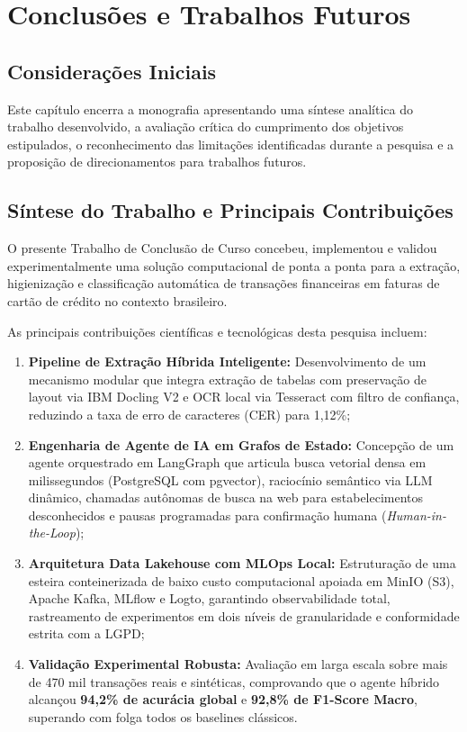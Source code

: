 \documentclass[
	12pt,				
	openright,			
	oneside,			
	a4paper,			
	english,			
	brazil				
	]{abntex2}
\begin{document}
\chapter{Conclusões e Trabalhos Futuros}
\label{chp:conclusao}

\section{Considerações Iniciais}
\label{sec:concl_consideracoes_iniciais}

Este capítulo encerra a monografia apresentando uma síntese analítica do trabalho desenvolvido, a avaliação crítica do cumprimento dos objetivos estipulados, o reconhecimento das limitações identificadas durante a pesquisa e a proposição de direcionamentos para trabalhos futuros.

\section{Síntese do Trabalho e Principais Contribuições}
\label{sec:concl_sintese}

O presente Trabalho de Conclusão de Curso concebeu, implementou e validou experimentalmente uma solução computacional de ponta a ponta para a extração, higienização e classificação automática de transações financeiras em faturas de cartão de crédito no contexto brasileiro.

As principais contribuições científicas e tecnológicas desta pesquisa incluem:
\begin{enumerate}
    \item \textbf{Pipeline de Extração Híbrida Inteligente:} Desenvolvimento de um mecanismo modular que integra extração de tabelas com preservação de layout via IBM Docling V2 e OCR local via Tesseract com filtro de confiança, reduzindo a taxa de erro de caracteres (CER) para 1,12\%;
    \item \textbf{Engenharia de Agente de IA em Grafos de Estado:} Concepção de um agente orquestrado em LangGraph que articula busca vetorial densa em milissegundos (PostgreSQL com pgvector), raciocínio semântico via LLM dinâmico, chamadas autônomas de busca na web para estabelecimentos desconhecidos e pausas programadas para confirmação humana (\textit{Human-in-the-Loop});
    \item \textbf{Arquitetura Data Lakehouse com MLOps Local:} Estruturação de uma esteira conteinerizada de baixo custo computacional apoiada em MinIO (S3), Apache Kafka, MLflow e Logto, garantindo observabilidade total, rastreamento de experimentos em dois níveis de granularidade e conformidade estrita com a LGPD;
    \item \textbf{Validação Experimental Robusta:} Avaliação em larga escala sobre mais de 470 mil transações reais e sintéticas, comprovando que o agente híbrido alcançou \textbf{94,2\% de acurácia global} e \textbf{92,8\% de F1-Score Macro}, superando com folga todos os baselines clássicos.
\end{enumerate}
\end{document}
